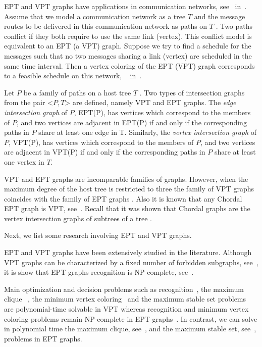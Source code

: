 EPT and VPT graphs have applications in communication networks, see~\cite{boyaci2013graphs} in~\cite{brandstadt2013graph}. Assume
that we model a communication network as a tree $T$ and the message routes to be delivered in this communication network as paths on $T$ . Two paths conflict if they both require to use the same link (vertex). This conflict model is equivalent to an EPT (a VPT) graph. Suppose we try to find a schedule for the messages such that no two messages sharing a link (vertex) are scheduled in the same time interval. Then a vertex coloring of the EPT (VPT) graph corresponds to a feasible schedule on this network, ~\cite{boyaci2013graphs} in~\cite{brandstadt2013graph}.

 Let $P$ be a family of paths on a host tree $T$ . Two types of intersection graphs from the pair <$P,T$> are defined, namely VPT and EPT graphs.
The \textit{edge intersection graph} of $P$, EPT(P), has vertices which correspond to the members of $P$, and two vertices are adjacent in EPT(P) if and only if the corresponding paths in $P$ share at least one edge in T. Similarly, the \textit{vertex intersection graph} of $P$, VPT(P), has vertices which correspond to the members of $P$, and two vertices are adjacent in VPT(P) if and only if the corresponding paths in $P$ share at least one vertex in $T$.

VPT and EPT graphs are incomparable families of graphs. However, when the maximum degree of the host tree is restricted to three the family of
VPT graphs coincides with the family of EPT graphs \cite{golumbic1985edge}. Also it is known that any Chordal EPT graph is VPT, see~\cite{syslo1985triangulated}. Recall that it was shown that Chordal graphs are the vertex intersection graphs of subtrees of a tree \cite{gavril1974intersection}.

Next, we list some research involving EPT and VPT graphs.

EPT and VPT graphs have been extensively studied in the literature. Although VPT graphs can be characterized by a fixed number of forbidden subgraphs, see~\cite{leveque2009characterizing}, it is show that EPT graphs recognition is NP-complete, see~\cite{golumbic1985}.

Main optimization and decision problems such as recognition~\cite{gavril1978recognition}, the maximum clique~\cite{gavril2000maximum} , the minimum vertex coloring~\cite{golumbic2004algorithmic}  and the maximum stable set problems~\cite{spinrad1995algorithms} are polynomial-time solvable in VPT whereas recognition and minimum vertex coloring problems remain NP-complete in EPT graphs~\cite{golumbic1985edge}. In contrast, we can solve in polynomial time the maximum clique,
see~\cite{golumbic1985}, and the maximum stable set, see~\cite{tarjan1985decomposition},  problems in EPT graphs. 


